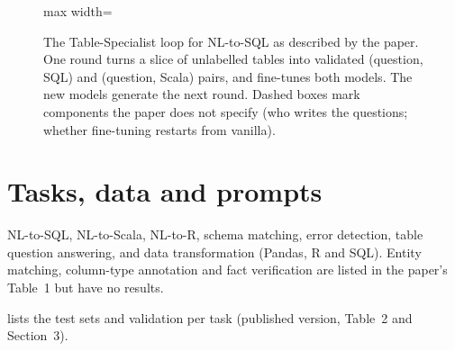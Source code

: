 \begin{figure}[htbp]
\centering
\begin{adjustbox}{max width=\linewidth}\end{adjustbox}
\caption{The Table-Specialist loop for NL-to-SQL as described by the paper. One round turns a slice of unlabelled tables
into validated (question, SQL) and (question, Scala) pairs, and fine-tunes both models. The new models generate the next
round. Dashed boxes mark components the paper does not specify (who writes the questions; whether fine-tuning
restarts from vanilla).}
\label{fig:paper-loop}
\end{figure}

\section{Tasks, data and prompts}

\begin{paperbox}[title={Tasks with results in the paper (Llama-3.1-8B)}]
NL-to-SQL, NL-to-Scala, NL-to-R, schema matching, error detection, table question answering, and data
transformation (Pandas, R and SQL). Entity matching, column-type annotation and fact verification are listed in the
paper's Table~1 but have no results.
\end{paperbox}

 lists the test sets and validation per task (published version, Table~2 and Section~3).

